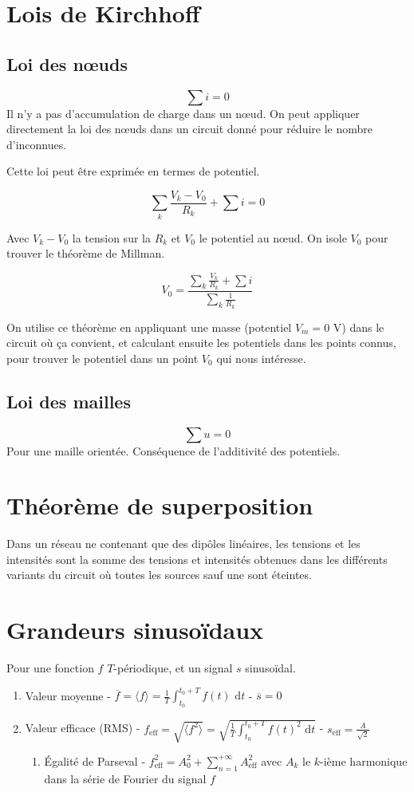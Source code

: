 \documentclass[openany]{book}
\begin{document}
\section{Lois de Kirchhoff}

\subsection{Loi des nœuds}
\[ \sum i = 0 \]
Il n'y a pas d'accumulation de charge dans un nœud. On peut appliquer directement la loi des nœuds dans un circuit donné pour réduire le nombre d'inconnues. 

\noindent Cette loi peut être exprimée en termes de potentiel.

\[ \sum_k \frac{V_k - V_0}{R_k} + \sum i = 0 \]

\noindent Avec $V_k - V_0$ la tension sur la $ R_k $ et $V_0$ le potentiel au nœud. On isole $V_0$ pour trouver le théorème de Millman. 

\[ V_0 = \frac{\sum_k \frac{V_k}{R_k} + \sum i}{\sum_k \frac{1}{R_k}} \]

\noindent On utilise ce théorème en appliquant une masse (potentiel $ V_m = 0 \text{ V}$) dans le circuit où ça convient, et calculant ensuite les potentiels dans les points connus, pour trouver le potentiel dans un point $V_0$ qui nous intéresse. 

\subsection{Loi des mailles}
\[ \sum u = 0 \]
Pour une maille orientée. Conséquence de l'additivité des potentiels.

\section{Théorème de superposition}
Dans un réseau ne contenant que des dipôles linéaires, les tensions et les intensités sont la somme des tensions et intensités obtenues dans les différents variants du circuit où toutes les sources sauf une sont éteintes. 

\section{Grandeurs sinusoïdaux}

Pour une fonction $f$ $T$-périodique, et un signal $s$ sinusoïdal. 
\begin{enumerate}
    \item Valeur moyenne - $ \overline{f} = \langle f \rangle = \frac{1}{T}\int_{t_0}^{t_0+T} f(t) \text{ d}t $ - $ \overline{s} = 0 $
    \item Valeur efficace (RMS) - $ f_{\text{eff}} = \sqrt{\langle f^2 \rangle} = \sqrt{\frac{1}{T}\int_{t_0}^{t_0+T} f(t)^2 \text{ d}t} $ - $ s_{\text{eff}} = \frac{A}{\sqrt{2}} $
        \begin{enumerate}
            \item Égalité de Parseval - $ f_{\text{eff}}^2 = A_0^2 + \sum_{n=1}^{+\infty} A_{\text{eff}}^2 $ avec $A_k$ le $k$-ième harmonique dans la série de Fourier du signal $f$
        \end{enumerate}
\end{enumerate}
\end{document}
